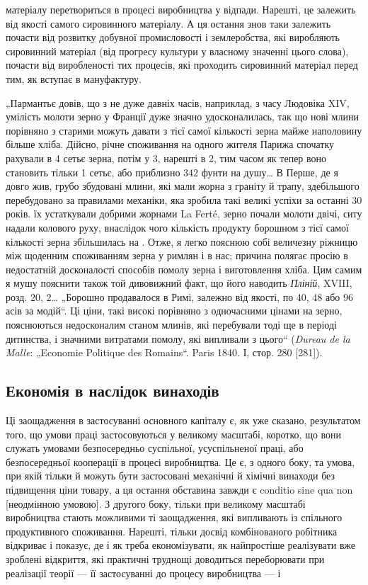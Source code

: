 \parcont{}  %
матеріалу перетвориться в процесі виробництва у відпади. Нарешті, це залежить від якості самого
сировинного матеріалу. А ця остання знов таки залежить почасти від розвитку добувної промисловості і
землеробства, які виробляють сировинний матеріал (від прогресу культури у власному значенні цього
слова), почасти від виробленості тих процесів, які проходить
сировинний матеріал перед тим, як вступає в мануфактуру.

„Пармантьє довів, що з не дуже давніх часів, наприклад, з часу Людовіка XIV, умілість молоти зерно у
Франції дуже
значно удосконалилась, так що нові млини порівняно з старими
можуть давати з тієї самої кількості зерна майже наполовину
більше хліба. Дійсно, річне споживання на одного жителя Парижа
спочатку рахували в 4 сетьє зерна, потім у 3, нарешті в 2, тим часом як тепер воно становить тільки
1 сетьє, або приблизно
342 фунти на душу\dots{} В Перше, де я довго жив, грубо збудовані млини, які мали жорна з граніту й
трапу, здебільшого перебудовано за правилами механіки, яка зробила такі великі успіхи за останні 30
років. їх устаткували добрими жорнами La Ferté,
зерно почали молоти двічі, ситу надали колового руху, внаслідок чого кількість продукту борошном з
тієї самої кількості
зерна збільшилась на . Отже, я легко пояснюю собі величезну
ріжницю між щоденним споживанням зерна у римлян і в нас;
причина полягає просію в недостатній досконалості способів
помолу зерна і виготовлення хліба. Цим самим я мушу пояснити
також той дивовижний факт, що його наводить \emph{Пліній}, XVIII,
розд. 20, 2\dots{} „Борошно продавалося в Римі, залежно від якості,
по 40, 48 або 96 асів за модій“. Ці ціни, такі високі порівняно
з одночасними цінами на зерно, пояснюються недосконалим станом млинів, які перебували тоді ще в
періоді дитинства, і значними витратами помолу, які випливали з цього“ (\emph{Dureau de la Malle}:
„Economie Politique des Romains“. Paris 1840. І, стор.
280 [281]).

\subsection{Економія в наслідок винаходів}

Ці заощадження в застосуванні основного капіталу є, як уже
сказано, результатом того, що умови праці застосовуються
у великому масштабі, коротко, що вони служать умовами безпосередньо суспільної, усуспільненої праці,
або безпосередньої
кооперації в процесі виробництва. Це є, з одного боку, та умова,
при якій тільки й можуть бути застосовані механічні й хімічні
винаходи без підвищення ціни товару, а ця остання обставина
завжди є conditio sine qua non [неодмінною умовою]. З другого
боку, тільки при великому масштабі виробництва стають можливими ті заощадження, які випливають із
спільного продуктивного
споживання. Нарешті, тільки досвід комбінованого робітника відкриває і показує, де і як треба
економізувати, як найпростіше
реалізувати вже зроблені відкриття, які практичні труднощі доводиться
переборювати при реалізації теорії — її застосуванні до
процесу виробництва — і~

